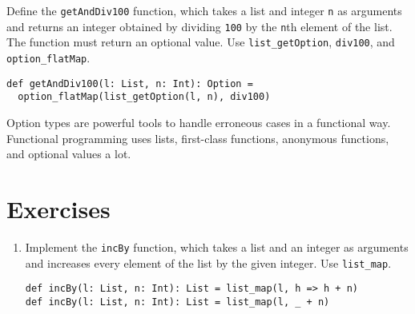 Define the \verb!getAndDiv100! function, which takes a list and integer \verb!n!
as arguments and returns an integer obtained by dividing \verb!100! by the
\verb!n!th element of the list. The function must return an optional value. Use
\verb!list_getOption!, \verb!div100!, and \verb!option_flatMap!.

\begin{verbatim}
def getAndDiv100(l: List, n: Int): Option =
  option_flatMap(list_getOption(l, n), div100)
\end{verbatim}

Option types are powerful tools to handle erroneous cases in a functional way.
Functional programming uses lists, first-class functions, anonymous functions,
and optional values a lot.

\section{Exercises}

\begin{enumerate}
\item
Implement the \verb!incBy! function, which takes a list and an integer as
arguments and increases every element of the list by the given integer. Use
\verb!list_map!.

\begin{verbatim}
def incBy(l: List, n: Int): List = list_map(l, h => h + n)
def incBy(l: List, n: Int): List = list_map(l, _ + n)
\end{verbatim}

\end{enumerate}
